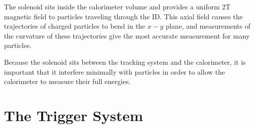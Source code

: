 The solenoid sits inside the calorimeter volume and provides a uniform 2T magnetic field to particles traveling through the \ac{ID}. This axial field causes the trajectories of charged particles to bend in the $x-y$ plane, and measurements of the curvature of these trajectories give the most accurate \pt measurement for many particles. 

Because the solenoid sits between the tracking system and the calorimeter, it is important that it interfere minimally with particles in order to allow the calorimeter to measure their full energies. 

\section{The Trigger System}
\label{sec:Trigger}
